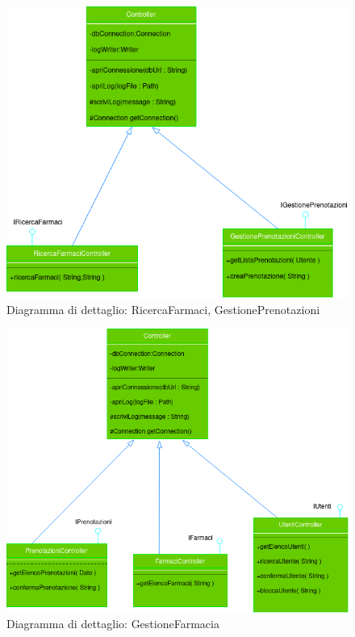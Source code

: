 \begin{figure}[h!]
    \begin{center}
        \includegraphics[width=\textwidth]{immagini/ControllerCliente-progettazione.png}
        \caption{Diagramma di dettaglio: RicercaFarmaci, GestionePrenotazioni}
    \end{center}
\end{figure}

\newpage

\begin{figure}[h!]
    \begin{center}
        \includegraphics[width=\textwidth]{immagini/ControllerFarmacia-progettazione.png}
        \caption{Diagramma di dettaglio: GestioneFarmacia}
    \end{center}
\end{figure}

